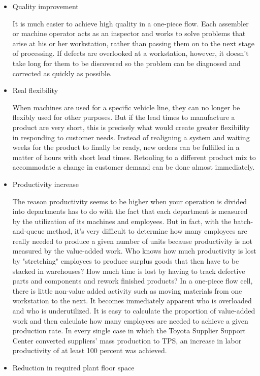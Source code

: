 \documentclass[a4paper,11pt]{article}
\begin{document}
\begin{itemize}
\item Quality improvement

  It is much easier to achieve high quality in a one-piece flow. Each
  assembler or machine operator acts as an inspector and works to solve
  problems that arise at his or her workstation, rather than passing them on
  to the next stage of processing. If defects are overlooked at a workstation,
  however, it doesn't take long for them to be discovered so the problem can
  be diagnosed and corrected as quickly as possible.
\item Real flexibility

  When machines are used for a specific vehicle line, they can no longer be
  flexibly used for other purposes. But if the lead times to manufacture a
  product are very short, this is precisely what would create greater
  flexibility in responding to customer needs. Instead of realigning a system
  and waiting weeks for the product to finally be ready, new orders can be
  fulfilled in a matter of hours with short lead times. Retooling to a
  different product mix to accommodate a change in customer demand can be done
  almost immediately.
\item Productivity increase

  The reason productivity seems to be higher when your operation is divided
  into departments has to do with the fact that each department is measured by
  the utilization of its machines and employees. But in fact, with the
  batch-and-queue method, it's very difficult to determine how many employees
  are really needed to produce a given number of units because productivity is
  not measured by the value-added work. Who knows how much productivity is
  lost by "stretching" employees to produce surplus goods that then have to be
  stacked in warehouses? How much time is lost by having to track defective
  parts and components and rework finished products? In a one-piece flow cell,
  there is little non-value added activity such as moving materials from one
  workstation to the next. It becomes immediately apparent who is overloaded
  and who is underutilized. It is easy to calculate the proportion of
  value-added work and then calculate how many employees are needed to achieve
  a given production rate. In every single case in which the Toyota Supplier
  Support Center converted suppliers' mass production to TPS, an increase in
  labor productivity of at least 100 percent was achieved.
\item Reduction in required plant floor space


\end{itemize}
\end{document}
